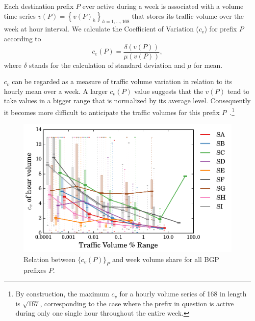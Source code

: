 Each destination prefix $P$ ever active during a week is associated with a volume time series $v(P)={\left\{ v(P)_h\right\} }_{h=1, \dots, 168}$ that
stores its traffic volume over the week at hour interval. 
We calculate the Coefficient of Variation ($c_v$) for prefix $P$ according to
\begin{equation*}
c_v(P) = \frac{\delta(v(P))}{\mu(v(P))},
\label{eq:cv}
\end{equation*}
where $\delta$ stands for the calculation of standard deviation and $\mu$ for mean.

$c_v$ can be regarded as a measure of traffic volume variation in relation to its hourly mean over a week.
A larger $c_v(P)$ value suggests that the $v(P)$ tend to take values in a bigger range that is normalized by its average level. 
Consequently it becomes more difficult to anticipate the traffic volumes for this prefix $P$~\cite{He2005}.\footnote{By construction, the maximum $c_v$ for a hourly volume series of 168 in length is $\sqrt{167}$, corresponding to the case where the prefix in question is active during only one single hour throughout the entire week.}

\begin{figure}[!htb]
\centering
\includegraphics[width=1\textwidth]{gfx/chap2/cv_bin.pdf}
\caption{Relation between $\{c_v(P)\}_P$  and  week volume share for all BGP prefixes $P$. 
}
\label{fig:cv}
\end{figure}

